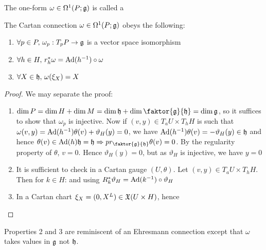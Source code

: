 \documentclass{article}
\begin{document}
\begin{definition}
	The one-form $\omega \in \Omega^1(P;\mathfrak{g})$ is called a 
\end{definition}

\begin{prop}
	The Cartan connection $\omega \in \Omega^1(P;\mathfrak{g})$ obeys the following:
	\begin{enumerate}
		\item $\forall p \in P, \, \omega_p : T_pP \to \mathfrak{g}$ is a vector space isomorphism 
		\item $\forall h \in H, \, r_h^\ast \omega = \operatorname{Ad}(h^{-1})\circ \omega$
		\item $\forall X \in \mathfrak{h}, \, \omega(\xi_X) = X$
	\end{enumerate}
\end{prop}
\begin{proof}
	We may separate the proof:
	\begin{enumerate}
		\item $\dim P = \dim H + \dim M = \dim \mf{h} + \dim \faktor{\mf{g}}{\mf{h}} = \dim \mf{g}$, so it suffices to show that $\omega_p$ is injective. Now if $(v,y) \in T_a U \times T_h H$ is such that $\omega(v,y) = \operatorname{Ad}(h^{-1})\theta(v) + \vartheta_H(y)=0$, we have $\operatorname{Ad}(h^{-1}) \theta(v) = -\vartheta_H(y) \in \mathfrak{h}$ and hence $\theta(v) \in \Ad(h)\mf{h} = \mf{h} \Rightarrow pr_{\faktor{\mf{g}}{\mf{h}}}\theta(v) = 0$. By the regularity property of $\theta$, $v=0$. Hence $\vartheta_H(y) = 0$, but as $\vartheta_H$ is injective, we have $y=0$ 
		\item It is sufficient to check in a Cartan gauge $(U,\theta)$. Let $(v,y)\in T_aU \times T_hH$. Then for $k \in H$:
		and using $R_k^\ast \vartheta_H = \operatorname{Ad}(k^{-1})\circ \vartheta_H$
		\item In a Cartan chart $\xi_X = (0,X^L) \in \mathfrak{X}(U \times H)$, hence 
	\end{enumerate}
\end{proof}

\begin{remark}
	Properties 2 and 3 are reminiscent of an Ehresmann connection except that $\omega$ takes values in $\mathfrak{g}$ not $\mathfrak{h}$. 
\end{remark}
\end{document}

